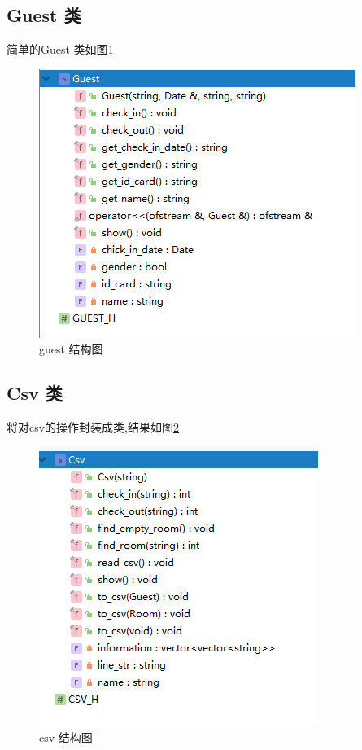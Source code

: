 \documentclass[UTF8]{ctexart}
\begin{document}
  \subsection{Guest 类}
    简单的Guest 类如图\ref{fig:structure_guest}
    \begin{figure}[H]
        \centering
        \includegraphics[scale = 1]{structure_guest}
        \caption{guest 结构图}
        \label{fig:structure_guest}
      \end{figure}

  \subsection{Csv 类}
    将对csv的操作封装成类,结果如图\ref{fig:structure_csv}
    \begin{figure}[H]
        \centering
        \includegraphics[scale = 1]{structure_csv}
        \caption{csv 结构图}
        \label{fig:structure_csv}
      \end{figure}
\end{document}
